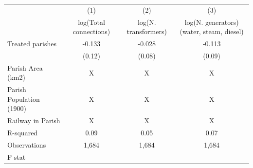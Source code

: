 {
\def\sym#1{\ifmmode^{#1}\else\(^{#1}\)\fi}
\begin{tabular}{l*{3}{c}}
\hline\hline
                    &\multicolumn{1}{c}{(1)}         &\multicolumn{1}{c}{(2)}         &\multicolumn{1}{c}{(3)}         \\
                    &log(Total connections)         &log(N. transformers)         &log(N. generators) (water, steam, diesel)         \\
\hline
Treated parishes    &      -0.133         &      -0.028         &      -0.113         \\
                    &      (0.12)         &      (0.08)         &      (0.09)         \\
\hline
Parish Area (km2)   &           X         &           X         &           X         \\
Parish Population (1900)&           X         &           X         &           X         \\
Railway in Parish   &           X         &           X         &           X         \\
R-squared           &        0.09         &        0.05         &        0.07         \\
Observations        &       1,684         &       1,684         &       1,684         \\
F-stat              &                     &                     &                     \\
\hline\hline
\end{tabular}
}
